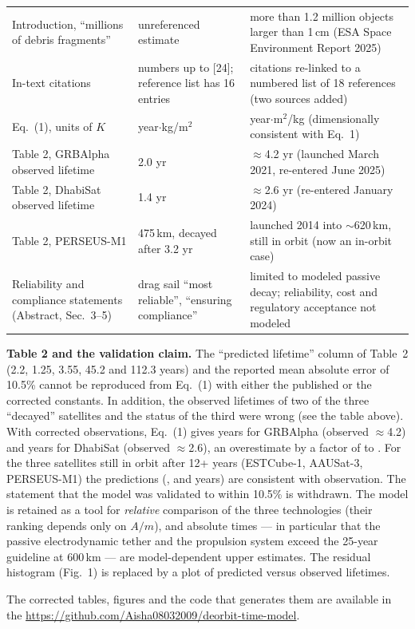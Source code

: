 \documentclass[11pt,a4paper]{article}
\begin{document}
\begin{center}
\begin{tabular}{@{}p{3.4cm}p{5.4cm}p{6.2cm}@{}}
Introduction, ``millions of debris fragments'' & unreferenced estimate & more than 1.2 million objects larger than 1\,cm (ESA Space Environment Report 2025) \\
In-text citations & numbers up to [24]; reference list has 16 entries & citations re-linked to a numbered list of 18 references (two sources added) \\
Eq.~(1), units of $K$ & year$\cdot$kg/m$^2$ & year$\cdot$m$^2$/kg (dimensionally consistent with Eq.~1) \\
Table 2, GRBAlpha observed lifetime & 2.0 yr & $\approx$4.2 yr (launched March 2021, re-entered June 2025) \\
Table 2, DhabiSat observed lifetime & 1.4 yr & $\approx$2.6 yr (re-entered January 2024) \\
Table 2, PERSEUS-M1 & 475\,km, decayed after 3.2 yr & launched 2014 into $\sim$620\,km, still in orbit (now an in-orbit case) \\
Reliability and compliance statements (Abstract, Sec.~3--5) & drag sail ``most reliable'', ``ensuring compliance'' & limited to modeled passive decay; reliability, cost and regulatory acceptance not modeled \\
\bottomrule
\end{tabular}
\end{center}

\medskip\noindent\textbf{Table 2 and the validation claim.} The ``predicted lifetime'' column of Table~2 (2.2, 1.25, 3.55, 45.2 and 112.3 years) and the reported mean absolute error of 10.5\% cannot be reproduced from Eq.~(1) with either the published or the corrected constants. In addition, the observed lifetimes of two of the three ``decayed'' satellites and the status of the third were wrong (see the table above). With corrected observations, Eq.~(1) gives \ValModelGRB{} years for GRBAlpha (observed $\approx$4.2) and \ValModelDhabi{} years for DhabiSat (observed $\approx$2.6), an overestimate by a factor of \ValLo{} to \ValHi{}. For the three satellites still in orbit after 12+ years (ESTCube-1, AAUSat-3, PERSEUS-M1) the predictions (\ValModelEst, \ValModelAau{} and \ValModelPerseus{} years) are consistent with observation. The statement that the model was validated to within 10.5\% is withdrawn. The model is retained as a tool for \emph{relative} comparison of the three technologies (their ranking depends only on $A/m$), and absolute times --- in particular that the passive electrodynamic tether and the propulsion system exceed the 25-year guideline at 600\,km --- are model-dependent upper estimates. The residual histogram (Fig.~1) is replaced by a plot of predicted versus observed lifetimes.

\medskip\noindent The corrected tables, figures and the code that generates them are available in the \url{https://github.com/Aisha08032009/deorbit-time-model}.
\end{document}
